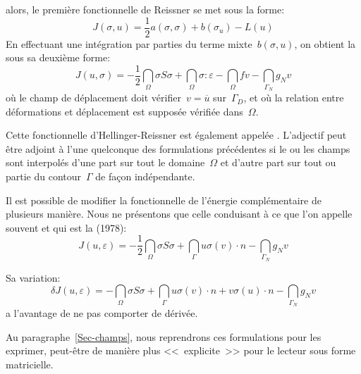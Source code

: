 alors, le première fonctionnelle de Reissner se met sous la forme:
\begin{equation} J(\sigma,u) = \frac12a(\sigma,\sigma)+b(\sigma_u)-L(u)\end{equation}
\medskip
En effectuant une intégration par parties du terme mixte~$b(\sigma,u)$, on obtient la
sous sa deuxième forme:
\begin{equation}
\label{Eq-HR2}
J(u,\sigma) =
-\frac12 \dint_\Omega \sigma S \sigma
+\dint_\Omega \sigma:\varepsilon
- \dint_\Omega f v
- \dint_{\Gamma_N} g_N v
\end{equation}
où le champ de déplacement doit vérifier~$v=\overline{u}$ sur~$\Gamma_D$,
et où la relation entre déformations et déplacement est supposée vérifiée dans~$\Omega$.

Cette fonctionnelle d'Hellinger-Reissner est également appelée .
\medskip
L'adjectif  peut être adjoint à l'une quelconque des formulations
précédentes si le ou les champs sont interpolés d'une part sur tout le domaine~$\Omega$
et d'autre part sur tout ou partie du contour~$\Gamma$ de façon indépendante.

Il est possible de modifier la fonctionnelle de l'énergie complémentaire de plusieurs manière.
Nous ne présentons que celle conduisant à ce que l'on appelle souvent  et
qui est la 
(1978):
\begin{equation}
J(u,\varepsilon) =
-\frac12 \dint_\Omega \sigma S \sigma
+\dint_\Gamma u \sigma(v)\cdot n
- \dint_{\Gamma_N} g_N v
\end{equation}

Sa variation:
\begin{equation}
\delta J(u,\varepsilon) =
-\dint_\Omega \sigma S \sigma
+\dint_\Gamma u \sigma(v)\cdot n + v \sigma(u)\cdot n
- \dint_{\Gamma_N} g_N v
\end{equation}
a l'avantage de ne pas comporter de dérivée.

\medskip
Au paragraphe~\ref{Sec-champs}, nous reprendrons ces formulations pour les exprimer,
peut-être de manière plus <<~explicite~>> pour le lecteur sous forme matricielle.

